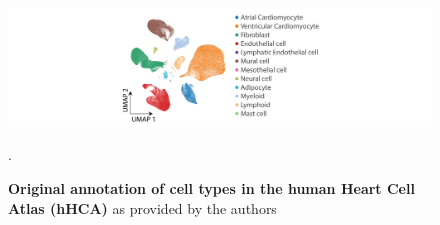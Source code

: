 \begin{table}[H]
    \centering
    \caption{\textbf{The significance of improvements in the single-cell SCEPIA analyses per cell type.} Testing the significance of improvements between Pearson correlations as calculated for the baseline comparison and SCEPIA with Maelstrom, for each of the 7 scRNA-seq subsets and per cell type. The same was also done for the SCEPIA with Maelstrom correlations, with or without the GeoSketch run (right column). P-values were calculated with a one-sided Wilcoxon signed-rank test.}
    \label{tab:significance_scbenchmark}
\end{table}

\begin{figure}
    \centering
    \includegraphics[width=\linewidth]{ch.scepia/imgs/SCEPIA_OriginalAnnotation_allCells_SuppFigAnno_Centered.png}
    \caption{\textbf{Original annotation of cell types in the human Heart Cell Atlas (hHCA)} as provided by the authors \cite{Kanemaru2023}}.
    \label{fig:scepia_annotation1}
\end{figure}

